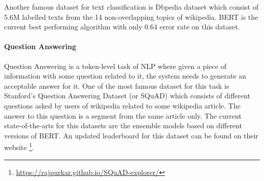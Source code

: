 Another famous dataset for text classification is Dbpedia dataset which consist of 5.6M labelled texts from the 14 non-overlapping topics of wikipedia. BERT \cite{devlin2018bert} is the current best performing algorithm with only 0.64 error rate on this dataset.

\paragraph{Question Answering}
Question Answering is a token-level task of NLP where given a piece of information with some question related to it, the system needs to generate an acceptable answer for it. One of the most famous dataset for this task is Stanford's Question Answering Dataset (or SQuAD) which consists of different questions asked by users of wikipedia related to some wikipedia article. The answer to this question is a segment from the same article only. The current state-of-the-arts for this datasets are the ensemble models based on different versions of BERT. An updated leaderboard for this dataset can be found on their website \footnote{\url{https://rajpurkar.github.io/SQuAD-explorer/}}.


